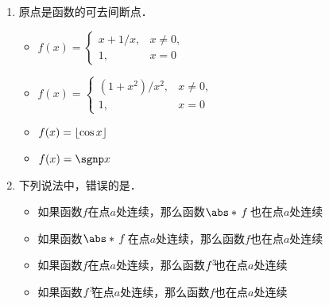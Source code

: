 \documentclass[a4paper,punct=CCT]{ctexbook}
\theoremstyle{definition}
\theoremstyle{remark}
\newif\ifshowsol
\begin{document}
\begin{enumerate}
\item 原点是函数\uline{\makebox[6em]{}}的可去间断点．
  \begin{itemize}
    \renewcommand{\labelitemi}{\faCircleThin}
  \item
    \begin{math}
      f(x) =
      \begin{cases}
        x + 1/x, & x \ne 0, \\
        1, & x = 0
      \end{cases}
    \end{math}
  \item
    \begin{math}
      f(x) =
      \begin{cases}
        (1+x^2)/x^2, & x \ne 0, \\
        1, & x = 0
      \end{cases}
    \end{math}
    \ifshowsol
  \item[\faCircle]
    \else
  \item
    \fi
    \(f(x) = \lfloor\cos x\rfloor\)
  \item \(f(x) = \sgnp x\)
  \end{itemize}

  \ifshowsol
  原点分别是选项~A、B中函数的第二类间断点、选项~C中函数的可去间断点、选项~D中的跳跃间断点．
  \fi

\item 下列说法中，错误的是\uline{\makebox[10em]{}}．
  \begin{itemize}
    \renewcommand{\labelitemi}{\faCircleThin}
  \item 如果函数\(f\)在点\(a\)处连续，那么函数\(\abs*{\,f\,}\)也在点\(a\)处连续
    \ifshowsol
  \item[\faCircle]
    \else
  \item
    \fi
    如果函数\(\abs*{\,f\,}\)在点\(a\)处连续，那么函数\(f\)也在点\(a\)处连续
  \item 如果函数\(f\)在点\(a\)处连续，那么函数\(f^3\negthickspace\)也在点\(a\)处连续
  \item 如果函数\(f^3\negthickspace\)在点\(a\)处连续，那么函数\(f\)也在点\(a\)处连续
  \end{itemize}

  \ifshowsol
  由于反三角不等式，选项~A成立；由于定理~\ref{thm:contcomp}，选项~C和~D成立．选项~B的一个反例是函数\(2\fn H - 1\)，其中\(H\)是单位阶跃函数（定义~\ref{defn:heaviside}）．
  \fi


\end{enumerate}
\end{document}
